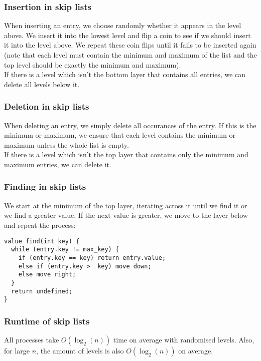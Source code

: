 \documentclass[a4paper, 12pt, twoside]{article}
\begin{document}
\subsubsection{Insertion in skip lists}

When inserting an entry, we choose randomly whether it appears in the level above.
We insert it into the lowest level and flip a coin to see if we should insert it 
into the level above. We repeat these coin flips until it fails to be inserted again
(note that each level must contain the minimum and maximum of the list and the top
level should be exactly the minimum and maximum).
\\[\baselineskip]
If there is a level which isn't the bottom layer that contains all entries, we can
delete all levels below it.

\subsubsection{Deletion in skip lists}

When deleting an entry, we simply delete all occurances of the entry. If this is the minimum
or maximum, we ensure that each level contains the minimum or maximum unless the
whole list is empty.
\\[\baselineskip]
If there is a level which isn't the top layer that contains only the minimum and maximum 
entries, we can delete it.

\subsubsection{Finding in skip lists}

We start at the minimum of the top layer, iterating across it until we find it or we find
a greater value. If the next value is greater, we move to the layer below and repeat the
process: \begin{lstlisting}
value find(int key) {
  while (entry.key != max_key) {
    if (entry.key == key) return entry.value;
    else if (entry.key >  key) move down;
    else move right;
  }
  return undefined;
}
\end{lstlisting}

\subsubsection{Runtime of skip lists}

All processes take $O(\log_2(n))$ time on average with randomised levels. Also,
for large $n$, the amount of levels is also $O(\log_2(n))$ on average.
\end{document}
